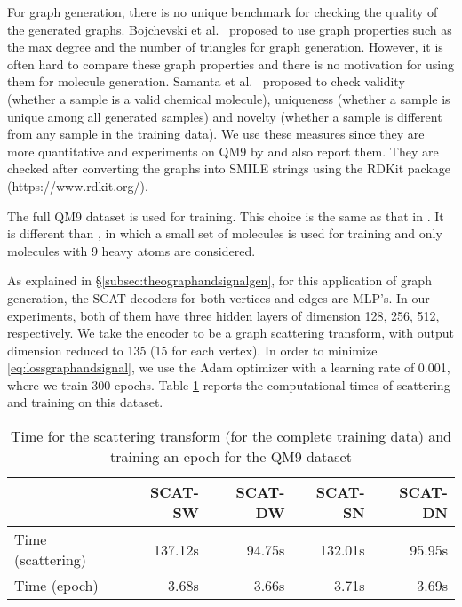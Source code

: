 \documentclass[conference]{IEEEtran}
\begin{document}
For graph generation, there is no unique benchmark for checking the quality of the generated graphs. Bojchevski et al.~\cite{bojchevski2018netgan} proposed to use graph properties such as the max degree and the number of triangles for graph generation. However, it is often hard to compare these graph properties and there is no motivation for using them for molecule generation.
Samanta et al.~\cite{samanta2018designing} proposed to check validity (whether a sample is a valid chemical molecule), uniqueness (whether a sample is unique among all generated samples) and novelty (whether a sample is different from any sample in the training data). We use these measures since they are more quantitative and experiments on QM9 by \cite{de2018molgan} and \cite{simonovsky2018graphvae} also report them. They are checked after converting the graphs into SMILE strings using the RDKit package (https://www.rdkit.org/).


The full QM9 dataset is used for training. This choice is the same as that in \cite[\S 5.3]{de2018molgan}. It is different than  \cite{simonovsky2018graphvae}, in which a small set of molecules is used for training and only molecules with 9 heavy atoms are considered. 


As explained in \S\ref{subsec:theographandsignalgen}, for this application of graph generation, the SCAT decoders for both vertices and edges are MLP's. In our experiments, both of them have three hidden layers of dimension 128, 256, 512, respectively. We take the encoder to be a graph scattering transform, with output dimension reduced to 135 (15 for each vertex).
In order to minimize \eqref{eq:lossgraphandsignal}, we use the Adam optimizer with a learning rate of 0.001, where we train 300 epochs.
Table \ref{tab:epochmol} reports the computational times of scattering and training on this dataset.

\begin{table}[t]
\caption{Time for the scattering transform (for the complete training data) and training an epoch for the QM9 dataset}\label{tab:epochmol}
\centering
\begin{tabular}{lrrrr}
~    &   SCAT-SW    &    SCAT-DW    &    SCAT-SN & SCAT-DN    \\
\hline
Time (scattering)     & 137.12s     &  94.75s    &   132.01s & 95.95s      \\
Time (epoch)      &  3.68s     &  3.66s     &    3.71s & 3.69s       \\
\end{tabular}
\end{table}
\end{document}
